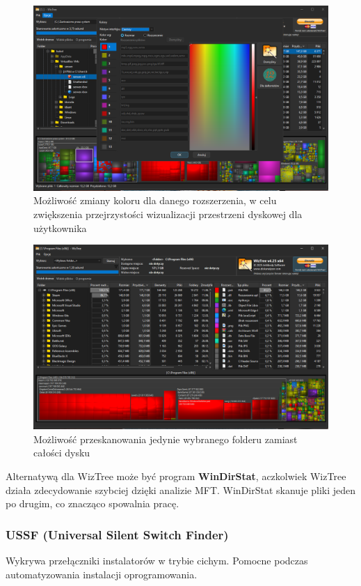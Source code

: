 \documentclass[0.82pt,a4paper]{article}
\begin{document}
    \begin{figure}[H]
        \centering
        \includegraphics[width=0.8\linewidth]{media/WizTree/wiz5.PNG}
        \caption[wiz kolory]{Możliwość zmiany koloru dla danego rozszerzenia, w celu zwiększenia przejrzystości wizualizacji przestrzeni dyskowej dla użytkownika}
        \label{fig:wiz_kolory}
    \end{figure}

    \begin{figure}[H]
        \centering
        \includegraphics[width=0.8\linewidth]{media/WizTree/wiz6.PNG}
        \caption[wiz folder]{Możliwość przeskanowania jedynie wybranego folderu zamiast całości dysku}
        \label{fig:wiz_skan_folder}
    \end{figure}
    Alternatywą dla WizTree może być program \textbf{WinDirStat}, aczkolwiek WizTree działa zdecydowanie szybciej dzięki analizie MFT. WinDirStat skanuje pliki jeden po drugim, co znacząco spowalnia pracę.

\newpage
\subsubsection{USSF (Universal Silent Switch Finder)}
    Wykrywa przełączniki instalatorów w trybie cichym. Pomocne podczas automatyzowania instalacji oprogramowania.
\end{document}
